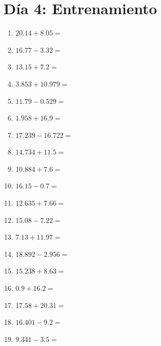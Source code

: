 \documentclass[12pt]{article}
\begin{document}
\section*{Día 4: Entrenamiento}
\begin{enumerate}
\item \large $ 20.14 + 8.05 = $ \vspace{1.5cm}
\item \large $ 16.77 - 3.32 = $ \vspace{1.5cm}
\item \large $ 13.15 + 7.2 = $ \vspace{1.5cm}
\item \large $ 3.853 + 10.979 = $ \vspace{1.5cm}
\item \large $ 11.79 - 0.529 = $ \vspace{1.5cm}
\item \large $ 1.958 + 16.9 = $ \vspace{1.5cm}
\item \large $ 17.239 - 16.722 = $ \vspace{1.5cm}
\item \large $ 14.734 + 11.5 = $ \vspace{1.5cm}
\item \large $ 10.884 + 7.6 = $ \vspace{1.5cm}
\item \large $ 16.15 - 0.7 = $ \vspace{1.5cm}
\newpage
\item \large $ 12.635 + 7.66 = $ \vspace{1.5cm}
\item \large $ 15.08 - 7.22 = $ \vspace{1.5cm}
\item \large $ 7.13 + 11.97 = $ \vspace{1.5cm}
\item \large $ 18.892 - 2.956 = $ \vspace{1.5cm}
\item \large $ 15.238 + 8.63 = $ \vspace{1.5cm}
\item \large $ 0.9 + 16.2 = $ \vspace{1.5cm}
\item \large $ 17.58 + 20.31 = $ \vspace{1.5cm}
\item \large $ 16.401 - 9.2 = $ \vspace{1.5cm}
\item \large $ 9.341 - 3.5 = $ \vspace{1.5cm}

\end{enumerate}
\end{document}
